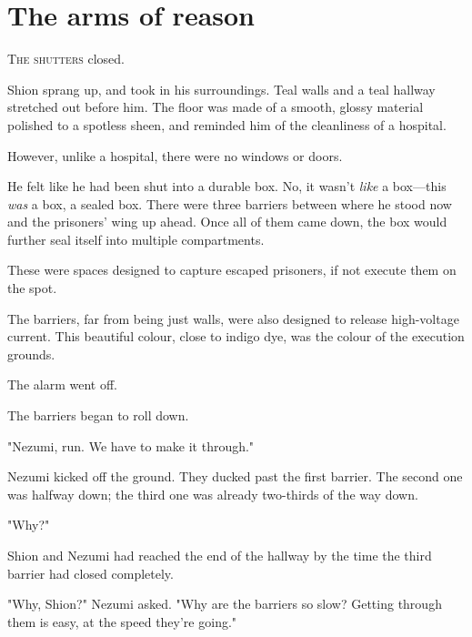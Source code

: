 
\chapter{The arms of reason}


\lettrine{T}{he shutters} closed.

Shion sprang up, and took in his surroundings. Teal walls and a teal
hallway stretched out before him. The floor was made of a smooth, glossy
material polished to a spotless sheen, and reminded him of the
cleanliness of a hospital.

However, unlike a hospital, there were no windows or doors.

He felt like he had been shut into a durable box. No, it wasn't \emph{like} a
box---this \emph{was} a box, a sealed box. There were three barriers between
where he stood now and the prisoners' wing up ahead. Once all of them
came down, the box would further seal itself into multiple compartments.

These were spaces designed to capture escaped prisoners, if not execute
them on the spot.

The barriers, far from being just walls, were also designed to release
high-voltage current. This beautiful colour, close to indigo dye, was
the colour of the execution grounds.

The alarm went off.

The barriers began to roll down.

"Nezumi, run. We have to make it through."

Nezumi kicked off the ground. They ducked past the first barrier. The
second one was halfway down; the third one was already two-thirds of the
way down.

"Why?"

Shion and Nezumi had reached the end of the hallway by the time the
third barrier had closed completely.

"Why, Shion?" Nezumi asked. "Why are the barriers so slow? Getting
through them is easy, at the speed they're going."

